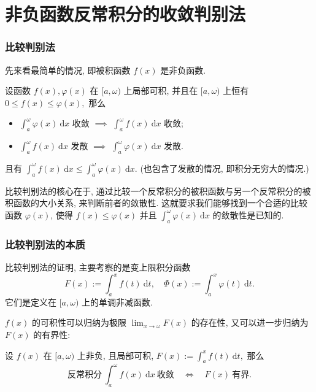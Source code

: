 
\section{非负函数反常积分的收敛判别法}


\begin{frame}
\frametitle{比较判别法}

先来看最简单的情况, 即被积函数 $f(x)$ 是非负函数.

\pause

\begin{thm}[比较判别法]
设函数 $f(x), \varphi(x)$ 在 $[a, \omega)$ 上局部可积, 并且在 $[a, \omega)$ 上恒有 $0 \leqslant f(x) \leqslant \varphi(x),$ 那么
\begin{itemize}
\item $\int_a^{\omega} \varphi(x) ~ \mathrm{d} x$ 收敛 $\implies$ $\int_a^{\omega} f(x) ~ \mathrm{d} x$ 收敛;
\item $\int_a^{\omega} f(x) ~ \mathrm{d} x$ 发散 $\implies$ $\int_a^{\omega} \varphi(x) ~ \mathrm{d} x$ 发散.
\end{itemize}
且有 $\displaystyle \int_a^{\omega} f(x) ~ \mathrm{d} x \leqslant \int_a^{\omega} \varphi(x) ~ \mathrm{d} x.$ (也包含了发散的情况, 即积分无穷大的情况.)
\end{thm}

\pause

\begin{remark}
比较判别法的核心在于, 通过比较一个反常积分的被积函数与另一个反常积分的被积函数的大小关系, 来判断前者的敛散性. 这就要求我们能够找到一个合适的比较函数 $\varphi(x)$, 使得 $f(x) \leqslant \varphi(x)$ 并且 $\int_a^{\omega} \varphi(x) ~ \mathrm{d} x$ 的敛散性是已知的.
\end{remark}

\end{frame}


\begin{frame}
\frametitle{比较判别法的本质}

比较判别法的证明, 主要考察的是变上限积分函数
\[
F(x) := \int_a^x f(t) ~ \mathrm{d} t, \quad \Phi(x) := \int_a^x \varphi(t) ~ \mathrm{d} t.
\]
它们是定义在 $[a, \omega)$ 上的单调非减函数.

$f(x)$ 的可积性可以归纳为极限 $\displaystyle \lim_{x \to \omega} F(x)$ 的存在性, 又可以进一步归纳为 $F(x)$ 的有界性:

\begin{prop}
设 $f(x)$ 在 $[a, \omega)$ 上非负, 且局部可积, $F(x) := \int_a^x f(t) ~ \mathrm{d} t,$ 那么
\[
\text{反常积分} ~ \int_a^{\omega} f(x) ~ \mathrm{d} x ~ \text{收敛} \quad \Longleftrightarrow \quad F(x) ~ \text{有界.}
\]
\end{prop}

\end{frame}


